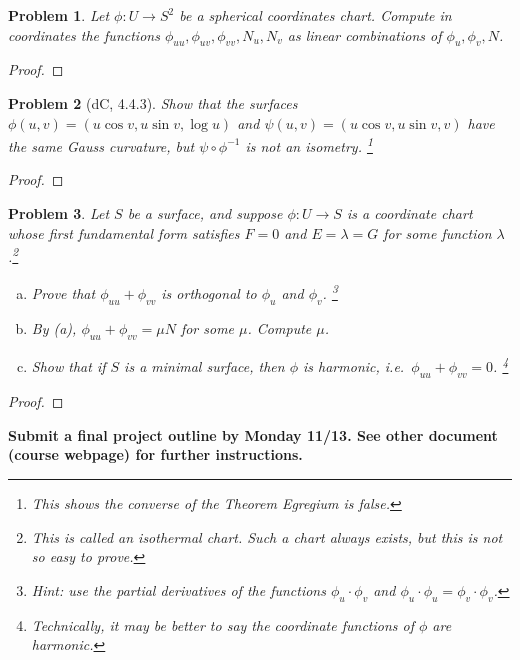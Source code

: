 \documentclass[11pt]{article}
\newtheorem{problem}{Problem}
\begin{document}
\pagebreak


\begin{problem}
Let $\phi:U\to S^2$ be a spherical coordinates chart. Compute in coordinates the functions $\phi_{uu},\phi_{uv},\phi_{vv},N_u,N_v$ as linear combinations of $\phi_u,\phi_v,N$. 
\end{problem}

\begin{proof}

\end{proof}

\pagebreak



\begin{problem}[dC, 4.4.3]
Show that the surfaces $\phi(u,v)=(u\cos v,u\sin v,\log u)$ and $\psi(u,v)=(u\cos v,u\sin v,v)$ have the same Gauss curvature, but $\psi\circ\phi^{-1}$ is not an isometry. \footnote{This shows the converse of the Theorem Egregium is false.} 
\end{problem}

\begin{proof}

\end{proof}

\pagebreak

\begin{problem}
Let $S$ be a surface, and suppose $\phi:U\to S$ is a coordinate chart whose first fundamental form satisfies $F=0$ and $E=\lambda=G$ for some function $\lambda$.\footnote{This is called an isothermal chart. Such a chart always exists, but this is not so easy to prove.} 
\begin{enumerate}[(a)]
\item Prove that $\phi_{uu}+\phi_{vv}$ is orthogonal to $\phi_u$ and $\phi_v$. \footnote{Hint: use the partial derivatives of the functions $\phi_u\cdot\phi_v$ and $\phi_u\cdot\phi_u=\phi_v\cdot\phi_v$.} 
\item By (a), $\phi_{uu}+\phi_{vv}=\mu N$ for some $\mu$. Compute $\mu$. 
\item Show that if $S$ is a minimal surface, then $\phi$ is harmonic, i.e.\ $\phi_{uu}+\phi_{vv}=0$. \footnote{Technically, it may be better to say the coordinate functions of $\phi$ are harmonic.} 
\end{enumerate} 
\end{problem}

\begin{proof}

\end{proof}

\pagebreak

{\bf Submit a final project outline by Monday 11/13. See other document (course webpage) for further instructions. }
\end{document}
